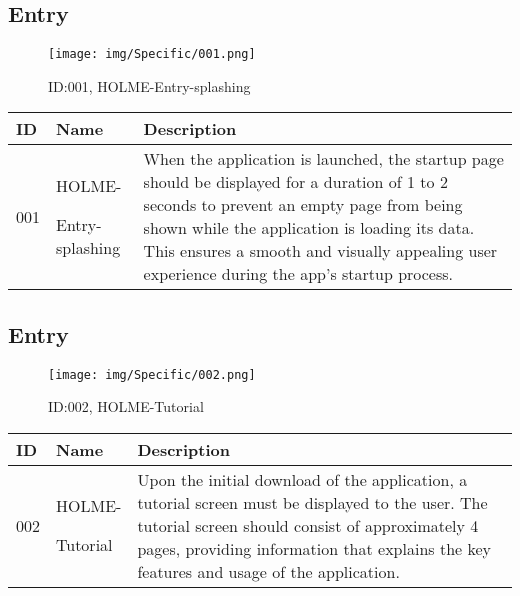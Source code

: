 \documentclass[conference]{IEEEtran}
\begin{document}
\subsection{Entry}
\begin{enumerate}
\begin{figure}[h]
\centering
\texttt{[image: img/Specific/001.png]}
\caption{ID:001, HOLME-Entry-splashing}
\end{figure}

\begin{table}[h]
\def\arraystretch{1.2} \small
    \begin{tabular}{|p{1cm}|p{1.8cm}|p{5.0cm}|}
        \hline
        ID & Name & Description\\ \hline
         001 \par  & HOLME-\par Entry-splashing & When the application is launched, the startup page should be displayed for a duration of 1 to 2 seconds to prevent an empty page from being shown while the application is loading its data. This ensures a smooth and visually appealing user experience during the app's startup process.\\ \hline
    \end{tabular}
\end{table}

\subsection{Entry}

\begin{figure}[h]
\centering
\texttt{[image: img/Specific/002.png]}
\caption{ID:002, HOLME-Tutorial}
\end{figure}
\begin{table}[h]
\def\arraystretch{1.2} \small
    \begin{tabular}{|p{1cm}|p{1.8cm}|p{5.0cm}|}
        \hline
        ID & Name & Description\\ \hline
         002 \par  & HOLME-\par Tutorial &
Upon the initial download of the application, a tutorial screen must be displayed to the user. The tutorial screen should consist of approximately 4 pages, providing information that explains the key features and usage of the application.\\ \hline
    \end{tabular}
\end{table}
\clearpage


\end{enumerate}
\end{document}
